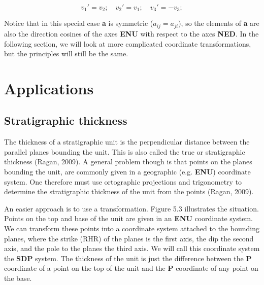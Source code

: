 \documentclass[a4paper , 12pt]{book}
\begin{document}
\begin{equation}
    v_1\text{$'$}=v_2;\quad v_2\text{$'$}=v_1; \quad v_3\text{$'$}=-v_3;
\end{equation}

Notice that in this special case \textbf{a} is symmetric ($a_{ij}=a_{ji}$), so the elements of \textbf{a} are also the direction cosines of the axes \textbf{ENU} with respect to the axes \textbf{NED}. In the following section, we will look at more complicated coordinate transformations, but the principles will still be the same.

\section{Applications}

\subsection{Stratigraphic thickness}

The thickness of a stratigraphic unit is the perpendicular distance between the parallel planes bounding the unit. This is also called the true or stratigraphic thickness (Ragan, 2009). A general problem though is that points on the planes bounding the unit, are commonly given in a geographic (e.g. \textbf{ENU}) coordinate system. One therefore must use ortographic projections and trigonometry to determine the stratigraphic thickness of the unit from the points (Ragan, 2009).

An easier approach is to use a transformation. Figure 5.3 illustrates the situation. Points on the top and base of the unit are given in an \textbf{ENU} coordinate system. We can transform these points into a coordinate system attached to the bounding planes, where the strike (RHR) of the planes is the first axis, the dip the second axis, and the pole to the planes the third axis. We will call this coordinate system the \textbf{SDP} system. The thickness of the unit is just the difference between the \textbf{P} coordinate of a point on the top of the unit and the \textbf{P} coordinate of any point on the base.
\end{document}
